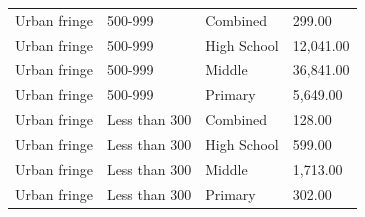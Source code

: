 \documentclass[man]{apa6}
\begin{document}
\begin{table}[tbp]
\begin{center}
\begin{threeparttable}
\begin{tabular}{llll}
Urban fringe & 500-999 & Combined & 299.00\\
Urban fringe & 500-999 & High School & 12,041.00\\
Urban fringe & 500-999 & Middle & 36,841.00\\
Urban fringe & 500-999 & Primary & 5,649.00\\
Urban fringe & Less than 300 & Combined & 128.00\\
Urban fringe & Less than 300 & High School & 599.00\\
Urban fringe & Less than 300 & Middle & 1,713.00\\
Urban fringe & Less than 300 & Primary & 302.00\\
\bottomrule
\end{tabular}

\end{threeparttable}
\end{center}

\end{table}
\end{document}
